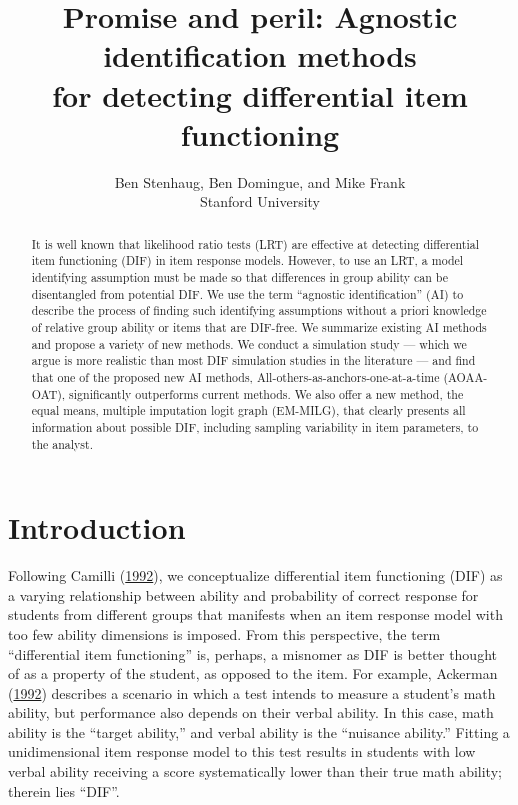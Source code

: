 \documentclass[
  11pt,
]{article}
\title{Promise and peril: Agnostic identification methods\\
for detecting differential item functioning}
\subtitle{Ben Stenhaug, Ben Domingue, and Mike Frank\\
Stanford University}
\author{}
\date{\vspace{-2.5em}}
\begin{document}
\maketitle
\begin{abstract}
It is well known that likelihood ratio tests (LRT) are effective at detecting differential item functioning (DIF) in item response models. However, to use an LRT, a model identifying assumption must be made so that differences in group ability can be disentangled from potential DIF. We use the term ``agnostic identification'' (AI) to describe the process of finding such identifying assumptions without a priori knowledge of relative group ability or items that are DIF-free. We summarize existing AI methods and propose a variety of new methods. We conduct a simulation study --- which we argue is more realistic than most DIF simulation studies in the literature --- and find that one of the proposed new AI methods, All-others-as-anchors-one-at-a-time (AOAA-OAT), significantly outperforms current methods. We also offer a new method, the equal means, multiple imputation logit graph (EM-MILG), that clearly presents all information about possible DIF, including sampling variability in item parameters, to the analyst. \clearpage
\end{abstract}

{
\setcounter{tocdepth}{5}
\tableofcontents
}
\clearpage

\hypertarget{intro}{%
\section{Introduction}\label{intro}}

Following Camilli (\protect\hyperlink{ref-camilli1992conceptual}{1992}), we conceptualize differential item functioning (DIF) as a varying relationship between ability and probability of correct response for students from different groups that manifests when an item response model with too few ability dimensions is imposed. From this perspective, the term \enquote{differential item functioning} is, perhaps, a misnomer as DIF is better thought of as a property of the student, as opposed to the item. For example, Ackerman (\protect\hyperlink{ref-ackerman1992didactic}{1992}) describes a scenario in which a test intends to measure a student's math ability, but performance also depends on their verbal ability. In this case, math ability is the \enquote{target ability,} and verbal ability is the \enquote{nuisance ability.} Fitting a unidimensional item response model to this test results in students with low verbal ability receiving a score systematically lower than their true math ability; therein lies \enquote{DIF}.
\end{document}
